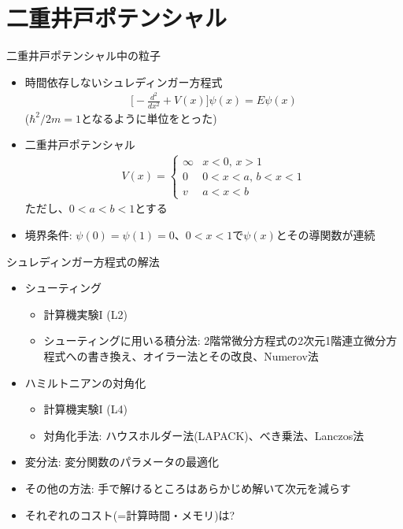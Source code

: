 \section{二重井戸ポテンシャル}

\begin{frame}[t,fragile]{二重井戸ポテンシャル中の粒子}
  \begin{itemize}
  \item 時間依存しないシュレディンガー方程式
    \begin{align*}
      \big[ -\frac{d^2}{dx^2} + V(x) \big] \psi(x) = E \psi(x)
    \end{align*}
    ($\hbar^2/2m = 1$となるように単位をとった)
  \item 二重井戸ポテンシャル
    \begin{align*}
      V(x) = \begin{cases}
        \infty & \text{$x < 0$, $x > 1$} \\
        0 & \text{$0 < x < a$, $b < x < 1$} \\
        v & \text{$a < x < b$}
      \end{cases}
    \end{align*}
    ただし、$0<a<b<1$とする
  \item 境界条件: $\psi(0) = \psi(1) = 0$、$0 < x < 1$で$\psi(x)$とその導関数が連続
  \end{itemize}
\end{frame}

\begin{frame}[t,fragile]{シュレディンガー方程式の解法}
  \begin{itemize}
  \item シューティング
    \begin{itemize}
    \item 計算機実験I (L2)
    \item シューティングに用いる積分法: 2階常微分方程式の2次元1階連立微分方程式への書き換え、オイラー法とその改良、Numerov法
    \end{itemize}
  \item ハミルトニアンの対角化
    \begin{itemize}
    \item 計算機実験I (L4)
    \item 対角化手法: ハウスホルダー法(LAPACK)、べき乗法、Lanczos法
    \end{itemize}
  \item 変分法: 変分関数のパラメータの最適化
  \item その他の方法: 手で解けるところはあらかじめ解いて次元を減らす
  \item それぞれのコスト(=計算時間・メモリ)は?
  \end{itemize}
\end{frame}
